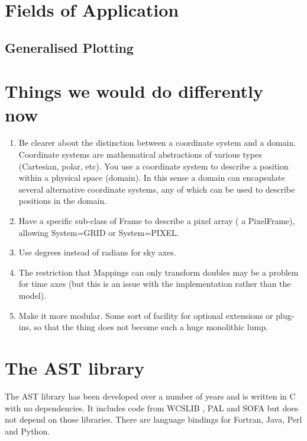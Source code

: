 \documentclass[final,authoryear,5p,times,twocolumn]{elsarticle}
\begin{document}
\section{Fields of Application}



\subsection{Generalised Plotting}

\section{Things we would do differently now}

\begin{enumerate}

\item Be clearer about the distinction between a coordinate system and
  a domain. Coordinate systems are mathematical abstractions of
  various types (Cartesian, polar, etc). You use a coordinate system
  to describe a position within a physical space (domain). In this
  sense a domain can encapsulate several alternative coordinate
  systems, any of which can be used to describe positions in the
  domain.

\item Have a specific sub-class of Frame to describe a pixel array ( a
  PixelFrame), allowing System=GRID or System=PIXEL.

\item Use degrees instead of radians for sky axes.

\item The restriction that Mappings can only transform doubles may be
  a problem for time axes (but this is an issue with the
  implementation rather than the model).

\item Make it more modular. Some sort of facility for optional
  extensions or plug-ins, so that the thing does not become such a
  huge monolithic lump.

\end{enumerate}

\section{The AST library}

The AST library has been developed over a number of years
\citep{1998ASPC..145...41W,2000ASPC..216..506W,2001ASPC..238..129B,2004ASPC..314..412B,2008ASPC..394..635B,2010ASPC..434..213B,2012ASPC..461..825B}
  and is written in C with no dependencies. It includes code from
  WCSLIB \citep[][]{2006ASPC..351..591C}, PAL \citep{2013ASPC..475..307J}
  and SOFA \citep[][]{2011SchpJ...611404H} but does not depend on those
  libraries. There are language bindings for Fortran, Java, Perl and
  Python.
\end{document}
